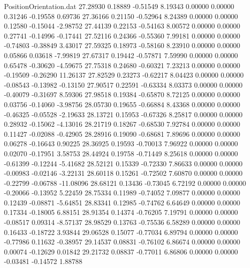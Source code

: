 \begin{filecontents}{PositionOrientation.dat}
  27.28930    0.18889   -0.51549     8.19343    0.00000    0.00000    0.31246   -0.19558    0.69736
  27.36166    0.21150   -0.52964     8.24389    0.00000    0.00000    0.12580   -0.15044   -2.98752
  27.44139    0.22153   -0.54163     8.00572    0.00000    0.00000    0.27741   -0.14996   -0.17441
  27.52116    0.24366   -0.55360     7.99181    0.00000    0.00000   -0.74803   -0.38849    3.43017
  27.59325    0.18973   -0.58160     8.23910    0.00000    0.00000    0.05866    0.03618   -7.99819
  27.67317    0.19442   -0.57871     7.59990    0.00000    0.00000    0.65478   -0.30620   -4.59675
  27.75318    0.24680   -0.60321     7.23213    0.00000    0.00000   -0.19509   -0.26290   11.26137
  27.82529    0.23273   -0.62217     8.04423    0.00000    0.00000   -0.08543   -0.13982   -0.13150
  27.90517    0.22591   -0.63334     8.03373    0.00000    0.00000   -0.40079   -0.31697    8.59306
  27.98518    0.19384   -0.65870     8.72125    0.00000    0.00000    0.03756   -0.14060   -3.98756
  28.05730    0.19655   -0.66884     8.43368    0.00000    0.00000   -0.46325   -0.05528   -2.19633
  28.13721    0.15953   -0.67326     8.25817    0.00000    0.00000    0.28932   -0.15062   -4.13016
  28.21719    0.18267   -0.68530     7.92784    0.00000    0.00000    0.11427   -0.02088   -0.42905
  28.28916    0.19090   -0.68681     7.89696    0.00000    0.00000    0.06278   -0.16643    0.90225
  28.36925    0.19593   -0.70013     7.96922    0.00000    0.00000    0.02070   -0.17951    3.58753
  28.44924    0.19758   -0.71449     8.25618    0.00000    0.00000   -0.61399   -0.12244   -5.41682
  28.52121    0.15339   -0.72330     7.86633    0.00000    0.00000   -0.00983   -0.02146   -3.22131
  28.60118    0.15261   -0.72502     7.60870    0.00000    0.00000   -0.22799   -0.06788  -11.08096
  28.68121    0.13436   -0.73045     6.72192    0.00000    0.00000   -0.20066   -0.13952    5.22459
  28.75334    0.11989   -0.74052     7.09877    0.00000    0.00000    0.12439   -0.08871   -5.64851
  28.83341    0.12985   -0.74762     6.64649    0.00000    0.00000    0.17334   -0.18005    6.88151
  28.91354    0.14374   -0.76205     7.19791    0.00000    0.00000   -0.08517    0.09314   -8.57137
  28.98529    0.13763   -0.75536     6.58289    0.00000    0.00000    0.16433   -0.18722    3.93844
  29.06528    0.15077   -0.77034     6.89794    0.00000    0.00000   -0.77986    0.11632   -0.38957
  29.14537    0.08831   -0.76102     6.86674    0.00000    0.00000    0.00074   -0.12629    0.01842
  29.21732    0.08837   -0.77011     6.86806    0.00000    0.00000   -0.03481   -0.14572    1.88788

\end{filecontents}

